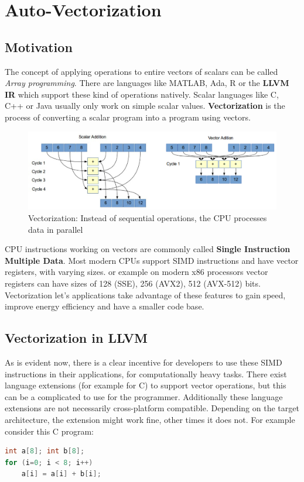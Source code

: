 
\section{Auto-Vectorization}
\label{sec:autovec}

\subsection{Motivation}
The concept of applying operations to entire vectors of scalars can be called \textit{Array programming}. There
are languages like MATLAB, Ada, R or the \textbf{LLVM IR}  which support these kind of operations natively. 
Scalar languages like C, C++ or Java usually only work on simple scalar values.
\textbf{Vectorization} is the process of converting a scalar program into a program using vectors. 

\begin{figure}[H]
  \caption{Vectorization: Instead of sequential operations, the CPU processes data in parallel}
  \centering
    \includegraphics[width=\textwidth]{../slides/pictures/vectorization}
\end{figure}

CPU instructions working on vectors are commonly called \textbf{Single Instruction Multiple Data}. 
Most modern CPUs support SIMD instructions and have vector registers, with varying sizes. 
or example on modern x86 processors vector registers can have sizes of 128 (SSE), 256 (AVX2), 512 (AVX-512) bits.
Vectorization let's applications take advantage of these features to gain speed,
improve energy efficiency and have a smaller code base.


\subsection{Vectorization in LLVM}

As is evident now, there is a clear incentive for developers to use these SIMD instructions in their applications,
for computationally heavy tasks.
There exist language extensions (for example for C) to support vector operations, but this can be a complicated to use 
for the programmer. Additionally these language extensions are not necessarily cross-platform compatible.
Depending on the target architecture, the extension might work fine, other times it does not. 
For example consider this C program:
\begin{lstlisting}[language=C,label={lst:unvectorized}]
int a[8]; int b[8];
for (i=0; i < 8; i++)
    a[i] = a[i] + b[i];
\end{lstlisting}

